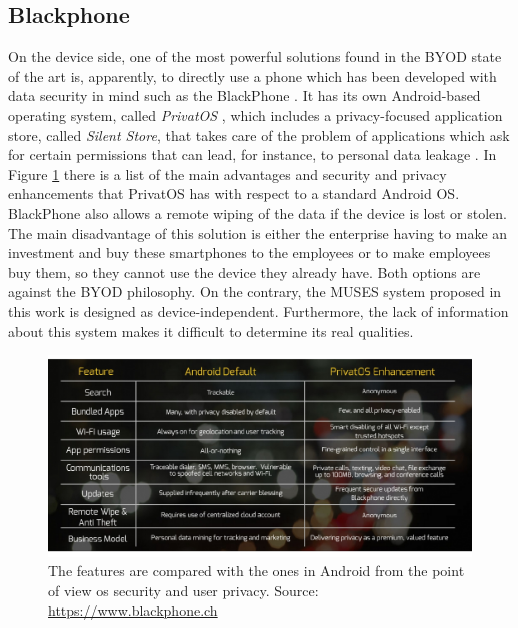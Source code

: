 
\subsection{Blackphone}
\label{subsec:blackphone}

On the device side, one of the most powerful solutions found in the BYOD state of the art is, apparently, to directly use a phone which has been developed with data security in mind such as the BlackPhone \cite{Blackphone}. It has its own Android-based operating system, called \textit{PrivatOS} \cite{Blackphone}, which includes a privacy-focused application store, called \textit{Silent Store}, that takes care of the problem of applications which ask for certain permissions that can lead, for instance, to personal data leakage \cite{gangula2013survey}. In Figure \ref{fig:blackphone} there is a list of the main advantages and security and privacy enhancements that PrivatOS has with respect to a standard Android OS. BlackPhone also allows a remote wiping of the data if the device is lost or stolen. The main disadvantage of this solution is either the enterprise having to make an investment and buy these smartphones to the employees or to make employees buy them, so they cannot use the device they already have. Both options are against the BYOD philosophy. On the contrary, the MUSES system proposed in this work is designed as device-independent.
Furthermore, the lack of information about this system makes it difficult to determine its real qualities.

\begin{figure}
	\centering
	\includegraphics[scale =0.5] {gfx/byodSotA/blackphone.pdf}
	\caption{The features are compared with the ones in Android from the point of view os security and user privacy. Source: \url{https://www.blackphone.ch}}
	\label{fig:blackphone}
\end{figure}


